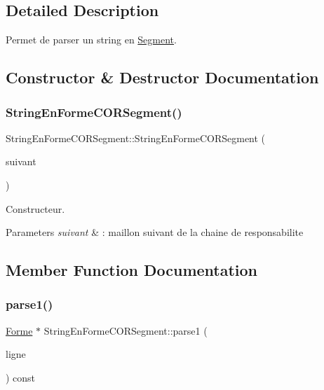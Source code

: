 \subsection{Detailed Description}
Permet de parser un string en \mbox{\hyperlink{class_segment}{Segment}}. 

\subsection{Constructor \& Destructor Documentation}
\mbox{\label{class_string_en_forme_c_o_r_segment_abf4e663d45a8515af8a668ba99c5859f}} 
\subsubsection{\texorpdfstring{StringEnFormeCORSegment()}{StringEnFormeCORSegment()}}
{\footnotesize\ttfamily String\+En\+Forme\+C\+O\+R\+Segment\+::\+String\+En\+Forme\+C\+O\+R\+Segment (\begin{DoxyParamCaption}\item[{\mbox{\hyperlink{class_string_en_forme_c_o_r}{String\+En\+Forme\+C\+OR}} $\ast$}]{suivant }\end{DoxyParamCaption})\hspace{0.3cm}{\ttfamily [inline]}}



Constructeur. 


\begin{DoxyParams}{Parameters}
{\em suivant} & \+: maillon suivant de la chaine de responsabilite \\
\hline
\end{DoxyParams}


\subsection{Member Function Documentation}
\mbox{\label{class_string_en_forme_c_o_r_segment_a89b4c233c5c4f5ccc17f9f993a6a6dbc}} 
\subsubsection{\texorpdfstring{parse1()}{parse1()}}
{\footnotesize\ttfamily \mbox{\hyperlink{class_forme}{Forme}} $\ast$ String\+En\+Forme\+C\+O\+R\+Segment\+::parse1 (\begin{DoxyParamCaption}\item[{const string \&}]{ligne }\end{DoxyParamCaption}) const\hspace{0.3cm}{\ttfamily [virtual]}}



